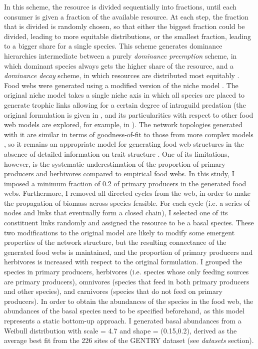 In this scheme, the resource is divided sequentially into fractions, until each consumer is given a fraction of the available resource. At each step, the fraction that is divided is randomly chosen, so that either the biggest fraction could be divided, leading to more equitable distributions, or the smallest fraction, leading to a bigger share for a single species. This scheme generates dominance hierarchies intermediate between a purely \textit{dominance preemption} scheme, in which dominant species always gets the higher share of the resource, and a \textit{dominance decay} scheme, in which resources are distributed most equitably \citep{Tokeshi1990}. Food webs were generated using a modified version of the niche model \citep{Williams2000}. The original niche model takes a single niche axis in which all species are placed to generate trophic links allowing for a certain degree of intraguild predation (the original formulation is given in \citealt{Williams2000}, and its particularities with respect to other food web models are explored, for example, in \citealt{Dunne2006}). The network topologies generated with it are similar in terms of goodness-of-fit to those from more complex models \citep{Williams2008}, so it remains an appropriate model for generating food web structures in the absence of detailed information on trait structure \citep{Gravel2016}. One of its limitations, however, is the systematic underestimation of the proportion of primary producers and herbivores compared to empirical food webs. In this study, I imposed a minimum fraction of 0.2 of primary producers in the generated food webs. Furthermore, I removed all directed cycles from the web, in order to make the propagation of biomass across species feasible. For each cycle (i.e. a series of nodes and links that eventually form a closed chain), I selected one of its constituent links randomly and assigned the resource to be a basal species. These two modifications to the original model are likely to modify some emergent properties of the network structure, but the resulting connectance of the generated food webs is maintained, and the proportion of primary producers and herbivores is increased with respect to the original formulation. I grouped the species in primary producers, herbivores (i.e. species whose only feeding sources are primary producers), omnivores (species that feed in both primary producers and other species), and carnivores (species that do not feed on primary producers). In order to obtain the abundances of the species in the food web, the abundances of the basal species need to be specified beforehand, as this model represents a static bottom-up approach. I generated basal abundances from a Weibull distribution with scale = 4.7 and shape = (0.15,0.2), derived as the average best fit from the 226 sites of the GENTRY dataset (see \textit{datasets} section).

